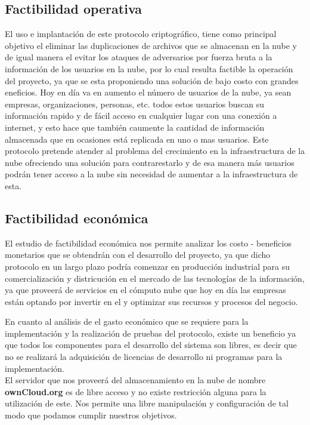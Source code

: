 \subsection{Factibilidad operativa}
El uso e implantación de este protocolo criptográfico, tiene como principal objetivo el eliminar las duplicaciones de archivos que se almacenan en la nube y de igual manera el evitar los ataques de adversarios por fuerza bruta a la información de los usuarios en la nube, por lo cual resulta factible la operación del proyecto, ya que se esta proponiendo una solución de bajo costo con grandes eneficios.
Hoy en día va en aumento el número de usuarios de la nube, ya sean empresas, organizaciones, personas, etc. todos estos usuarios buscan su información rapido y de fácil acceso en cualquier lugar con una conexión a internet, y esto hace que también caumente la cantidad de información almacenada que en ocasiones está replicada en uno o mas usuarios.
Este protocolo pretende atender al problema del crecimiento en la infraestructura de la nube ofreciendo una solución para contrarestarlo y de esa manera más usuarios podrán tener acceso a la nube sin necesidad de aumentar a la infraestructura de esta.

\subsection{Factibilidad económica}
El estudio de factibilidad económica nos permite analizar los costo - beneficios monetarios que se obtendrán con el desarrollo del proyecto, ya que dicho protocolo en un largo plazo podría comenzar en producción industrial para su comercialización y districución en el mercado de las tecnologías de la información, ya que proveerá de servicios en el cómputo nube que hoy en día las empresas están optando por invertir en el y optimizar sus recursos y procesos del negocio. 

En cuanto al análisis de el gasto económico que se requiere para la implementación y la realización de pruebas del protocolo, existe un beneficio ya que todos los componentes para el desarrollo del sistema son libres, es decir que no se realizará la adquisición de licencias de desarrollo ni programas para la implementación. 
\\ El servidor que nos proveerá del almacenamiento en la nube de nombre \textbf{ownCloud.org} es de libre acceso y no existe restricción alguna para la utilización de este. Nos permite una libre manipulación y configuración de tal modo que podamos cumplir nuestros objetivos.


